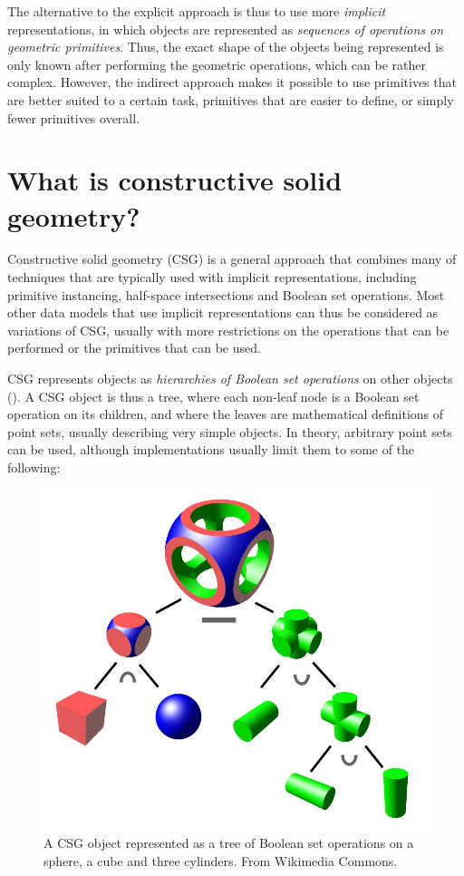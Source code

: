 
The alternative to the explicit approach is thus to use more \emph{implicit} representations, in which objects are represented as \emph{sequences of operations on geometric primitives}.
Thus, the exact shape of the objects being represented is only known after performing the geometric operations, which can be rather complex.
However, the indirect approach makes it possible to use primitives that are better suited to a certain task, primitives that are easier to define, or simply fewer primitives overall.

\section{What is constructive solid geometry?}

Constructive solid geometry (CSG) is a general approach that combines many of techniques that are typically used with implicit representations, including primitive instancing, half-space intersections and Boolean set operations.
Most other data models that use implicit representations can thus be considered as variations of CSG, usually with more restrictions on the operations that can be performed or the primitives that can be used.

CSG represents objects as \emph{hierarchies of Boolean set operations} on other objects ().
A CSG object is thus a tree, where each non-leaf node is a Boolean set operation on its children, and where the leaves are mathematical definitions of point sets, usually describing very simple objects.
In theory, arbitrary point sets can be used, although implementations usually limit them to some of the following:

\begin{figure}
\centering
\includegraphics[width=0.5\linewidth]{figs/csg}
\caption{A CSG object represented as a tree of Boolean set operations on a sphere, a cube and three cylinders. From Wikimedia Commons.}%
\label{fig:csg}
\end{figure}


